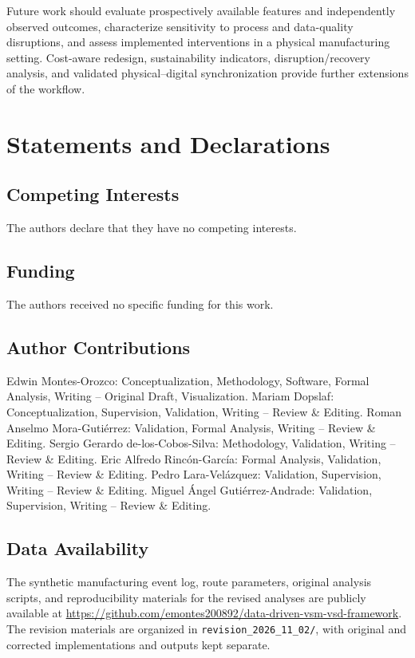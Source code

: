 \documentclass[pdflatex,iicol,Numbered,sn-basic]{sn-jnl}
\begin{document}
Future work should evaluate prospectively available features and independently observed outcomes, characterize sensitivity to process and data-quality disruptions, and assess implemented interventions in a physical manufacturing setting. Cost-aware redesign, sustainability indicators, disruption/recovery analysis, and validated physical--digital synchronization provide further extensions of the workflow.

\section*{Statements and Declarations}

\subsection*{Competing Interests}
The authors declare that they have no competing interests.

\subsection*{Funding}
The authors received no specific funding for this work.

\subsection*{Author Contributions}
Edwin Montes-Orozco: Conceptualization, Methodology, Software, Formal Analysis, Writing -- Original Draft, Visualization.
Mariam Dopslaf: Conceptualization, Supervision, Validation, Writing -- Review \& Editing.
Roman Anselmo Mora-Guti\'errez: Validation, Formal Analysis, Writing -- Review \& Editing.
Sergio Gerardo de-los-Cobos-Silva: Methodology, Validation, Writing -- Review \& Editing.
Eric Alfredo Rinc\'on-Garc\'ia: Formal Analysis, Validation, Writing -- Review \& Editing.
Pedro Lara-Vel\'azquez: Validation, Supervision, Writing -- Review \& Editing.
Miguel \'Angel Guti\'errez-Andrade: Validation, Supervision, Writing -- Review \& Editing.

\subsection*{Data Availability}
The synthetic manufacturing event log, route parameters, original analysis scripts, and reproducibility materials for the revised analyses are publicly available at \url{https://github.com/emontes200892/data-driven-vsm-vsd-framework}. The revision materials are organized in \texttt{revision\_2026\_11\_02/}, with original and corrected implementations and outputs kept separate.
\end{document}
